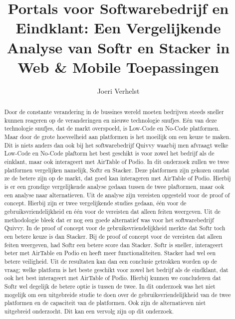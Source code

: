 \documentclass{hogent-article}
\title{Portals voor Softwarebedrijf en Eindklant: Een Vergelijkende Analyse van Softr en Stacker in Web \& Mobile Toepassingen}
\author{Joeri Verhelst}
\begin{document}
\begin{abstract}
  Door de constante verandering in de bussines wereld moeten bedrijven steeds sneller kunnen reageren op de veranderingen en nieuwe technologie snufjes. Eén van deze technologie snufjes, dat de markt overspoeld, is
  Low-Code en No-Code platformen. Maar door de grote hoeveelheid aan platformen is het moeilijk om een keuze te maken. Dit is niets anders dan ook bij het softwarebedrijf Quivvy waarbij men afvraagt welke Low-Code en No-Code plaftorm
  het best geschikt is voor zowel het bedrijf als de einklant, maar ook interageert met AirTable of Podio. In dit onderzoek zullen we twee platformen vergelijken namelijk, Softr en Stacker. Deze platformen zijn gekozen omdat ze de betere zijn
  op de markt, dat goed kan interageren met AirTable of Podio. Hierbij is er een grondige vergelijkende analyse gedaan tussen de twee plaftormen, maar ook een analyse naar alternatieven. Uit de analyse zijn vereisten opgesteld voor de proof of concept.
  Hierbij zijn er twee vergelijkende studies gedaan, één voor de gebruiksvriendelijkheid en één voor de vereisten dat alleen feiten weergeven. Uit de methodologie bleek dat er nog een goede alternatief was voor het softwarebedrijf Quivvy. In de proof of concept voor de gebruiksvriendelijkheid
  merkte dat Softr toch een betere keuze is dan Stacker. Bij de proof of concept voor de vereisten dat alleen feiten weergeven, had Softr een betere score dan Stacker. Softr is sneller, interageert beter met AirTable en Podio en heeft meer functionaliteiten. Stacker had wel 
  een betere veiligheid. Uit de resultaten kan dan een conclusie getrokken worden op de vraag; welke platform is het beste geschikt voor zowel het bedrijf als de eindklant, dat ook het best interageert met AirTable of Podio. Hierbij kunnen we concluderen dat Softr wel degelijk de betere optie 
  is tussen de twee. In dit onderzoek was het niet mogelijk om een uitgebreide studie te doen over de gebruiksvriendelijkheid van de twee platformen en de capaciteit van de platformen. Ook zijn de alternatieven niet uitgebreid onderzocht. Dit kan een vervolg zijn op dit onderzoek.
\end{abstract}

\tableofcontents



\printbibliography[heading=bibintoc]
\end{document}
